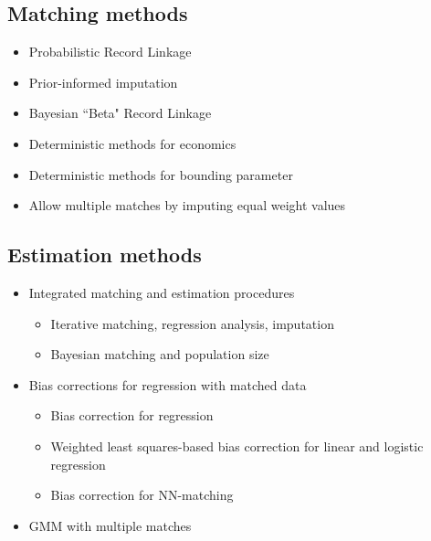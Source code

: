 \documentclass[12pt]{article}
\begin{document}
\subsection*{Matching methods}
\begin{itemize}
\item Probabilistic Record Linkage \citep{fellegi69, arp2018}
\item Prior-informed imputation \citep{Goldstein2012} 
\item Bayesian ``Beta" Record Linkage \citep{sadinle2017} 
\item Deterministic methods for economics  \citep{ferrie96, abe2012, abe2017}
\item Deterministic methods for bounding parameter \citep{nq2015}
\item Allow multiple matches by imputing equal weight values \citep{bleakley2016}


\end{itemize}

\subsection*{Estimation methods}
\begin{itemize}
\item Integrated matching and estimation procedures 
\begin{itemize}
\item Iterative matching, regression analysis, imputation \citep{sw1997}
\item  Bayesian matching and population size \citep{tancredi_liseo_2015}
\end{itemize}
\item Bias corrections for regression with matched data 
\begin{itemize}
\item Bias correction for regression \citep{sw1993, lahiri05} 
\item Weighted least squares-based bias correction for linear and logistic regression \citep{hof2012}
\item Bias correction for NN-matching \citep{hirukawa2018}
\end{itemize}
\item GMM with multiple matches \citep{ahl2019}
\end{itemize}


\newpage
 

\end{document}
